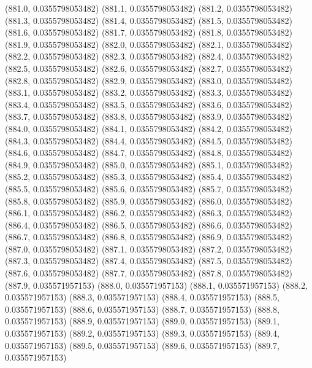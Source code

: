 {					(881.0, 0.0355798053482)
					(881.1, 0.0355798053482)
					(881.2, 0.0355798053482)
					(881.3, 0.0355798053482)
					(881.4, 0.0355798053482)
					(881.5, 0.0355798053482)
					(881.6, 0.0355798053482)
					(881.7, 0.0355798053482)
					(881.8, 0.0355798053482)
					(881.9, 0.0355798053482)
					(882.0, 0.0355798053482)
					(882.1, 0.0355798053482)
					(882.2, 0.0355798053482)
					(882.3, 0.0355798053482)
					(882.4, 0.0355798053482)
					(882.5, 0.0355798053482)
					(882.6, 0.0355798053482)
					(882.7, 0.0355798053482)
					(882.8, 0.0355798053482)
					(882.9, 0.0355798053482)
					(883.0, 0.0355798053482)
					(883.1, 0.0355798053482)
					(883.2, 0.0355798053482)
					(883.3, 0.0355798053482)
					(883.4, 0.0355798053482)
					(883.5, 0.0355798053482)
					(883.6, 0.0355798053482)
					(883.7, 0.0355798053482)
					(883.8, 0.0355798053482)
					(883.9, 0.0355798053482)
					(884.0, 0.0355798053482)
					(884.1, 0.0355798053482)
					(884.2, 0.0355798053482)
					(884.3, 0.0355798053482)
					(884.4, 0.0355798053482)
					(884.5, 0.0355798053482)
					(884.6, 0.0355798053482)
					(884.7, 0.0355798053482)
					(884.8, 0.0355798053482)
					(884.9, 0.0355798053482)
					(885.0, 0.0355798053482)
					(885.1, 0.0355798053482)
					(885.2, 0.0355798053482)
					(885.3, 0.0355798053482)
					(885.4, 0.0355798053482)
					(885.5, 0.0355798053482)
					(885.6, 0.0355798053482)
					(885.7, 0.0355798053482)
					(885.8, 0.0355798053482)
					(885.9, 0.0355798053482)
					(886.0, 0.0355798053482)
					(886.1, 0.0355798053482)
					(886.2, 0.0355798053482)
					(886.3, 0.0355798053482)
					(886.4, 0.0355798053482)
					(886.5, 0.0355798053482)
					(886.6, 0.0355798053482)
					(886.7, 0.0355798053482)
					(886.8, 0.0355798053482)
					(886.9, 0.0355798053482)
					(887.0, 0.0355798053482)
					(887.1, 0.0355798053482)
					(887.2, 0.0355798053482)
					(887.3, 0.0355798053482)
					(887.4, 0.0355798053482)
					(887.5, 0.0355798053482)
					(887.6, 0.0355798053482)
					(887.7, 0.0355798053482)
					(887.8, 0.0355798053482)
					(887.9, 0.035571957153)
					(888.0, 0.035571957153)
					(888.1, 0.035571957153)
					(888.2, 0.035571957153)
					(888.3, 0.035571957153)
					(888.4, 0.035571957153)
					(888.5, 0.035571957153)
					(888.6, 0.035571957153)
					(888.7, 0.035571957153)
					(888.8, 0.035571957153)
					(888.9, 0.035571957153)
					(889.0, 0.035571957153)
					(889.1, 0.035571957153)
					(889.2, 0.035571957153)
					(889.3, 0.035571957153)
					(889.4, 0.035571957153)
					(889.5, 0.035571957153)
					(889.6, 0.035571957153)
					(889.7, 0.035571957153)
}
